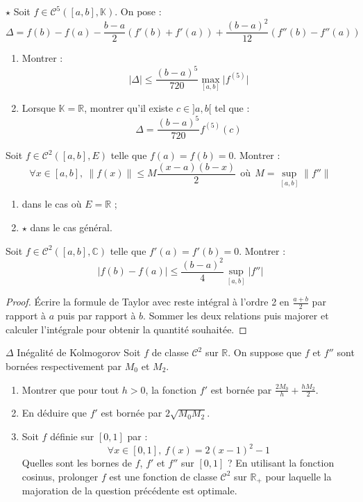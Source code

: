 \documentclass[french,a4paper]{article}
\newcommand{\R}{\mathbb{R}}
\newcommand{\C}{\mathbb{C}}
\newcommand{\K}{\mathbb{K}}
\theoremstyle{plain}
\theoremstyle{definition}
\theoremstyle{remark}
\begin{document}
\begin{ex}[Moulin.FV.24]{$\star$}
	Soit $f\in\mathcal{C}^5([a,b],\K)$. On pose : $$\Delta=f(b)-f(a)-\frac{b-a}{2}(f'(b)+f'(a))+\frac{(b-a)^2}{12}(f''(b)-f''(a))$$
	\begin{enumerate}
		\item Montrer : $$\lvert\Delta\rvert\leqslant\frac{(b-a)^5}{720}\underset{[a,b]}{\max}\lvert f^{(5)}\rvert$$
		\item Lorsque $\K=\R$, montrer qu'il existe $c\in]a,b[$ tel que : $$\Delta=\frac{(b-a)^5}{720}f^{(5)}(c)$$
	\end{enumerate}
\end{ex}

\begin{ex}[Moulin.FV.25]{}
	Soit $f\in\mathcal{C}^2([a,b],E)$ telle que $f(a)=f(b)=0$. Montrer : $$\forall x\in[a,b],\ \lVert f(x)\rVert\leqslant M\frac{(x-a)(b-x)}{2}\ \ \text{où}\ \ M=\underset{[a,b]}{\sup}\lVert f''\rVert$$
	\begin{enumerate}
		\item dans le cas où $E=\R$ ;
		\item $\star$ dans le cas général.
	\end{enumerate}
\end{ex}

\begin{ex}[Moulin.FV.26]{}
	Soit $f\in\mathcal{C}^2([a,b],\C)$ telle que $f'(a)=f'(b)=0$. Montrer : $$\lvert f(b)-f(a)\rvert\leqslant\frac{(b-a)^2}{4}\underset{[a,b]}{\sup}\lvert f''\rvert$$
\end{ex}
\begin{proof}
	Écrire la formule de Taylor avec reste intégral à l'ordre 2 en $\displaystyle\frac{a+b}{2}$ par rapport à $a$ puis par rapport à $b$. Sommer les deux relations puis majorer et calculer l'intégrale pour obtenir la quantité souhaitée.
\end{proof}

\begin{ex}[Moulin.FV.27]{$\Delta$ Inégalité de Kolmogorov}
	Soit $f$ de classe $\mathcal{C}^2$ sur $\R$. On suppose que $f$ et $f''$ sont bornées respectivement par $M_0$ et $M_2$.
	\begin{enumerate}
		\item Montrer que pour tout $h>0$, la fonction $f'$ est bornée par $\displaystyle\frac{2M_0}{h}+\frac{hM_2}{2}$.
		\item En déduire que $f'$ est bornée par $2\sqrt{M_0M_2}$.
		\item Soit $f$ définie sur $[0,1]$ par : $$\forall x\in[0,1],\ f(x)=2(x-1)^2-1$$ Quelles sont les bornes de $f$, $f'$ et $f''$ sur $[0,1]$ ? En utilisant la fonction cosinus, prolonger $f$ est une fonction de classe $\mathcal{C}^2$ sur $\R_+$ pour laquelle la majoration de la question précédente est optimale.
	\end{enumerate}
\end{ex}
\end{document}
